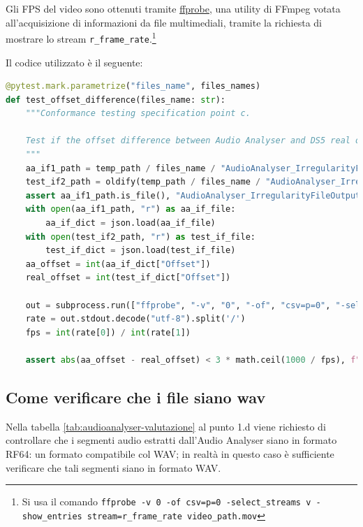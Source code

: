 Gli FPS del video sono ottenuti tramite \href{https://ffmpeg.org/ffprobe.html}{ffprobe}, una utility di FFmpeg votata all'acquisizione di informazioni da file multimediali, tramite la richiesta di mostrare lo stream \verb|r_frame_rate|.\footnote{Si usa il comando \texttt{ffprobe -v 0 -of csv=p=0 -select\_streams v -show\_entries stream=r\_frame\_rate video\_path.mov}}

Il codice utilizzato è il seguente:
\begin{lstlisting}[language=Python]
@pytest.mark.parametrize("files_name", files_names)
def test_offset_difference(files_name: str):
    """Conformance testing specification point c.

    Test if the offset difference between Audio Analyser and DS5 real offset is small.
    """
    aa_if1_path = temp_path / files_name / "AudioAnalyser_IrregularityFileOutput1.json"
    test_if2_path = oldify(temp_path / files_name / "AudioAnalyser_IrregularityFileOutput1.json")
    assert aa_if1_path.is_file(), "AudioAnalyser_IrregularityFileOutput1.json not found"
    with open(aa_if1_path, "r") as aa_if_file:
        aa_if_dict = json.load(aa_if_file)
    with open(test_if2_path, "r") as test_if_file:
        test_if_dict = json.load(test_if_file)
    aa_offset = int(aa_if_dict["Offset"])
    real_offset = int(test_if_dict["Offset"])

    out = subprocess.run(["ffprobe", "-v", "0", "-of", "csv=p=0", "-select_streams", "v", "-show_entries", "stream=r_frame_rate", str(working_path / "PreservationAudioVisualFile" / (files_name+".mov"))], capture_output=True)
    rate = out.stdout.decode("utf-8").split('/')
    fps = int(rate[0]) / int(rate[1])
    
    assert abs(aa_offset - real_offset) < 3 * math.ceil(1000 / fps), f"Offset difference is too big: {abs(aa_offset - real_offset)}ms"
\end{lstlisting}


\subsection{Come verificare che i file siano wav} \label{ssec:audioanalyser-wav}    %
Nella tabella \ref{tab:audioanalyser-valutazione} al punto 1.d viene richiesto di controllare che i segmenti audio estratti dall'Audio Analyser siano in formato RF64: un formato compatibile col WAV; in realtà in questo caso è sufficiente verificare che tali segmenti siano in formato WAV.


